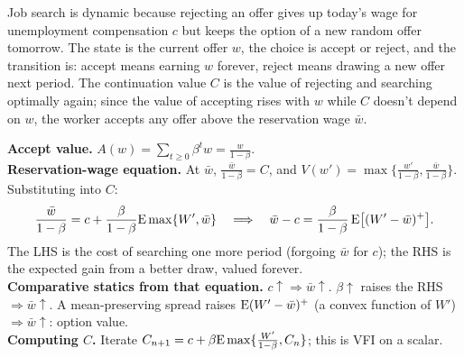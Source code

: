 \documentclass[11pt]{article}
\begin{document}
\begin{resp}
\begin{minipage}[t]{0.62\textwidth}\vspace{0pt}
Job search is dynamic because rejecting an offer gives up today's wage for unemployment compensation $c$ but keeps the option of a new random offer tomorrow. The state is the current offer $w$, the choice is accept or reject, and the transition is: accept means earning $w$ forever, reject means drawing a new offer next period. The continuation value $C$ is the value of rejecting and searching optimally again; since the value of accepting rises with $w$ while $C$ doesn't depend on $w$, the worker accepts any offer above the reservation wage $\bar w$.
\end{minipage}\hfill
\begin{minipage}[t]{0.34\textwidth}\vspace{0pt}\centering
\scalebox{0.75}{\figMcCall}
\end{minipage}
\end{resp}
\begin{intu}
\textbf{Accept value.} $A(w)=\sum_{t\ge0}\beta^tw=\frac{w}{1-\beta}$.\\
\textbf{Reservation-wage equation.} At $\bar w$, $\frac{\bar w}{1-\beta}=C$, and $V(w')=\max\{\frac{w'}{1-\beta},\frac{\bar w}{1-\beta}\}$. Substituting into $C$:
\[\frac{\bar w}{1-\beta}=c+\frac{\beta}{1-\beta}\mathrm{E}\max\{W',\bar w\}\quad\Longrightarrow\quad \bar w-c=\frac{\beta}{1-\beta}\,\mathrm{E}\big[(W'-\bar w)^+\big].\]
The LHS is the cost of searching one more period (forgoing $\bar w$ for $c$); the RHS is the expected gain from a better draw, valued forever.\\
\textbf{Comparative statics from that equation.} $c\uparrow\Rightarrow\bar w\uparrow$. $\beta\uparrow$ raises the RHS $\Rightarrow\bar w\uparrow$. A mean-preserving spread raises $\mathrm{E}(W'-\bar w)^+$ (a convex function of $W'$) $\Rightarrow\bar w\uparrow$: option value.\\
\textbf{Computing $C$.} Iterate $C_{n+1}=c+\beta\mathrm{E}\max\{\frac{W'}{1-\beta},C_n\}$; this is VFI on a scalar.
\end{intu}
\end{document}
